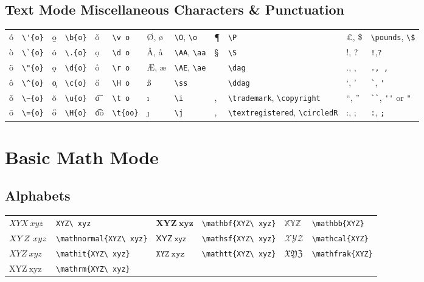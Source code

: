 \documentclass[10pt, english]{article}
\begin{document}
	\subsection{Text Mode Miscellaneous Characters \& Punctuation}

	\begin{center}
		\scriptsize
	\begin{tabular}{ll|ll|ll|ll|ll|ll}
		\'{o} & \verb|\'{o}| & \b{o} & \verb|\b{o}| & \v o & \verb|\v o| & \O, \o & \verb|\O|, \verb|\o| & \P & \verb|\P| & \pounds, \$ & \verb|\pounds|, \verb|\$| \\
		\`{o} & \verb|\`{o}| & \.{o} & \verb|\.{o}| & \d o & \verb|\d o| & \AA, \aa & \verb|\AA|, \verb|\aa| & \S & \verb|\S| & !, ? & \verb|!|,\verb|?| \\
		\"{o} & \verb|\"{o}| & \d{o} & \verb|\d{o}| & \r o & \verb|\r o| & \AE, \ae & \verb|\AE|, \verb|\ae| & \dag & \verb|\dag| & ., , & \verb|., ,| \\
		\^{o} & \verb|\^{o}| & \c{o} & \verb|\c{o}| & \H o & \verb|\H o| & \ss & \verb|\ss| & \ddag & \verb|\ddag| & `, ' & \verb|`|, \verb|'| \\
		\~{o} & \verb|\~{o}| & \u{o} & \verb|\u{o}| & \t o & \verb|\t o| & \i & \verb|\i| & \texttrademark, \textcopyright & \verb|\trademark|, \verb|\copyright| & ``, '' & \verb|``|, \verb|''| or \verb|"| \\
		\={o} & \verb|\={o}| & \H{o} & \verb|\H{o}| & \t{oo} & \verb|\t{oo}| & \j & \verb|\j| & \textregistered, \circledR & \verb|\textregistered|, \verb|\circledR| & :, ; & \verb|:|, \verb|;| \\
	\end{tabular}
	\end{center}

\section{Basic Math Mode}

	\subsection{Alphabets}

	\begin{center}
		\scriptsize
	\begin{tabular}{ll|ll|ll}
		$XYX\ xyz$ & \verb|XYZ\ xyz| & $\mathbf{XYZ\ xyz}$ & \verb|\mathbf{XYZ\ xyz}| & $\mathbb{XYZ}$ & \verb|\mathbb{XYZ}| \\ 
		$\mathnormal{XYZ\ xyz}$ & \verb|\mathnormal{XYZ\ xyz}| & $\mathsf{XYZ\ xyz}$ & \verb|\mathsf{XYZ\ xyz}| & $\mathcal{XYZ}$ & \verb|\mathcal{XYZ}| \\
		$\mathit{XYZ\ xyz}$ & \verb|\mathit{XYZ\ xyz}| & $\mathtt{XYZ\ xyz}$ & \verb|\mathtt{XYZ\ xyz}| & $\mathfrak{XYZ}$ & \verb|\mathfrak{XYZ}| \\
		$\mathrm{XYZ\ xyz}$ & \verb|\mathrm{XYZ\ xyz}| & 
	\end{tabular}
	\end{center}
\end{document}
